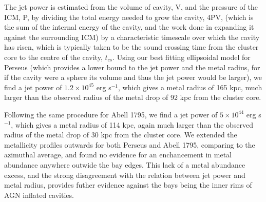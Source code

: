 \documentclass[useAMS,usenatbib]{mn2e}
\begin{document}
The jet power is estimated from the volume of cavity, V, and the pressure of the ICM, P, by dividing the total energy needed to grow the cavity, 4PV, (which is the sum
of the internal energy of the cavity, and the work done in expanding it against the surrounding ICM) by a characteristic timescale over which the cavity has risen, which is typically
taken to be the sound crossing time from the cluster core to the centre of the cavity, $t_{cs}$. Using our best fitting ellipsoidal model for Perseus (which provides a lower bound
to the jet power and the metal radius, for if the cavity were a sphere its volume and thus the jet power would be larger), we find a jet power of 
$1.2\times10^{45}$ erg s$^{-1}$, which gives a metal radius of 165 kpc, much larger than the observed radius of the metal drop of 92 kpc from the cluster core.

Following the same procedure for Abell 1795, we find a jet power of $5\times10^{44}$ erg s$^{-1}$, which gives a metal radius of 114 kpc, again much larger than the observed
radius of the metal drop of 30 kpc from the cluster core. We extended the metallicity profiles outwards for both Perseus and Abell 1795, comparing to the azimuthal average, and 
found no evidence for an enchancement in metal abundance anywhere outwide the bay edges. This lack of a metal abundance excess, and the strong disagreement with the \citet{Kirkpatrick2011}
relation between jet power and metal radius, provides futher evidence against the bays being the inner rims of AGN inflated cavities.
\end{document}
